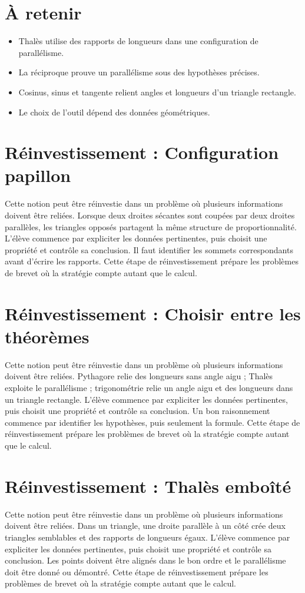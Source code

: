 \section{À retenir}
\begin{aretenir}
\begin{itemize}
\item Thalès utilise des rapports de longueurs dans une configuration de parallélisme.
\item La réciproque prouve un parallélisme sous des hypothèses précises.
\item Cosinus, sinus et tangente relient angles et longueurs d’un triangle rectangle.
\item Le choix de l’outil dépend des données géométriques.
\end{itemize}
\end{aretenir}

\section{Réinvestissement : Configuration papillon}
Cette notion peut être réinvestie dans un problème où plusieurs informations doivent être reliées. Lorsque deux droites sécantes sont coupées par deux droites parallèles, les triangles opposés partagent la même structure de proportionnalité. L’élève commence par expliciter les données pertinentes, puis choisit une propriété et contrôle sa conclusion. Il faut identifier les sommets correspondants avant d’écrire les rapports. Cette étape de réinvestissement prépare les problèmes de brevet où la stratégie compte autant que le calcul.

\section{Réinvestissement : Choisir entre les théorèmes}
Cette notion peut être réinvestie dans un problème où plusieurs informations doivent être reliées. Pythagore relie des longueurs sans angle aigu ; Thalès exploite le parallélisme ; trigonométrie relie un angle aigu et des longueurs dans un triangle rectangle. L’élève commence par expliciter les données pertinentes, puis choisit une propriété et contrôle sa conclusion. Un bon raisonnement commence par identifier les hypothèses, puis seulement la formule. Cette étape de réinvestissement prépare les problèmes de brevet où la stratégie compte autant que le calcul.

\section{Réinvestissement : Thalès emboîté}
Cette notion peut être réinvestie dans un problème où plusieurs informations doivent être reliées. Dans un triangle, une droite parallèle à un côté crée deux triangles semblables et des rapports de longueurs égaux. L’élève commence par expliciter les données pertinentes, puis choisit une propriété et contrôle sa conclusion. Les points doivent être alignés dans le bon ordre et le parallélisme doit être donné ou démontré. Cette étape de réinvestissement prépare les problèmes de brevet où la stratégie compte autant que le calcul.
